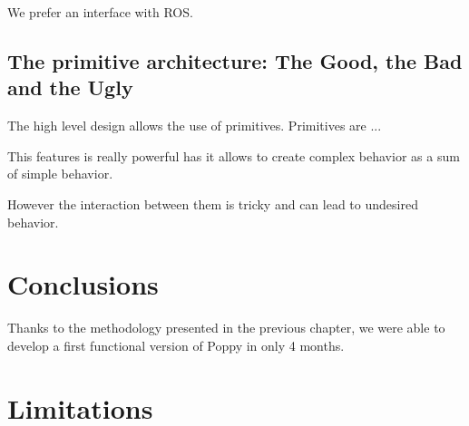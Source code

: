 We prefer an interface with ROS.

\subsection{The primitive architecture: The Good, the Bad and the Ugly} %
The high level design allows the use of primitives.
Primitives are ...

This features is really powerful has it allows to create complex behavior as a sum of simple behavior.


However the interaction between them is tricky and can lead to undesired behavior.



\section{Conclusions} %

Thanks to the methodology presented in the previous chapter, we were able to develop a first functional version of Poppy in only 4 months.

\section{Limitations} %




